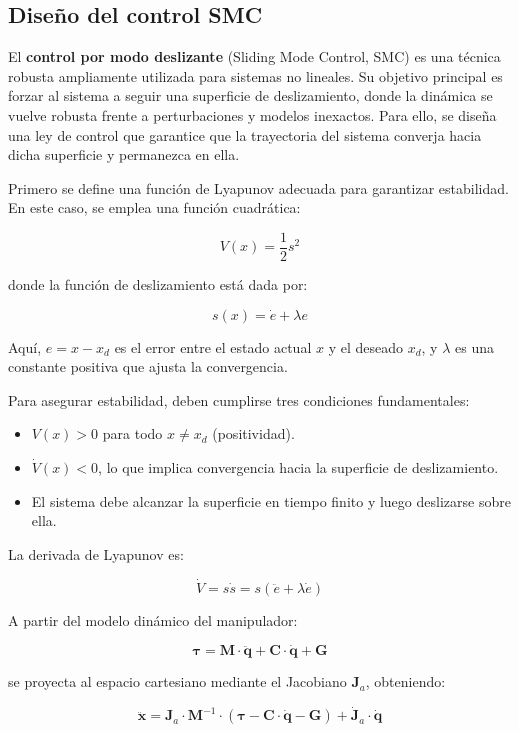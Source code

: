 \subsection{Diseño del control SMC}

El \textbf{control por modo deslizante} (Sliding Mode Control, SMC) es una
técnica robusta ampliamente utilizada para sistemas no lineales. Su objetivo
principal es forzar al sistema a seguir una superficie de deslizamiento, donde
la dinámica se vuelve robusta frente a perturbaciones y modelos inexactos. Para
ello, se diseña una ley de control que garantice que la trayectoria del sistema
converja hacia dicha superficie y permanezca en ella.

Primero se define una función de Lyapunov adecuada para garantizar estabilidad.
En este caso, se emplea una función cuadrática:

\[
    V(x) = \frac{1}{2} s^2
\]

donde la función de deslizamiento está dada por:

\[
    s(x) = \dot{e} + \lambda e
\]

Aquí, \( e = x - x_d \) es el error entre el estado actual \( x \) y el deseado
\( x_d \), y \( \lambda \) es una constante positiva que ajusta la
convergencia.

Para asegurar estabilidad, deben cumplirse tres condiciones fundamentales:

\begin{itemize}
    \item \( V(x) > 0 \) para todo \( x \neq x_d \) (positividad).
    \item \( \dot{V}(x) < 0 \), lo que implica convergencia hacia la superficie
          de deslizamiento.
    \item El sistema debe alcanzar la superficie en tiempo finito y luego
          deslizarse sobre ella.
\end{itemize}

La derivada de Lyapunov es:

\[
    \dot{V} = s \dot{s} = s(\ddot{e} + \lambda \dot{e})
\]

A partir del modelo dinámico del manipulador:

\[
    \boldsymbol{\tau} = \boldsymbol{M} \cdot \boldsymbol{\ddot{q}} + \boldsymbol{C} \cdot \boldsymbol{\dot{q}} + \boldsymbol{G}
\]

se proyecta al espacio cartesiano mediante el Jacobiano \( \boldsymbol{J}_a \), obteniendo:

\[
    \boldsymbol{\ddot{x}} = \boldsymbol{J}_a \cdot \boldsymbol{M}^{-1} \cdot (\boldsymbol{\tau} - \boldsymbol{C} \cdot \boldsymbol{\dot{q}} - \boldsymbol{G}) + \boldsymbol{\dot{J}}_a
    \cdot \boldsymbol{\dot{q}} \tag{1}
\]

